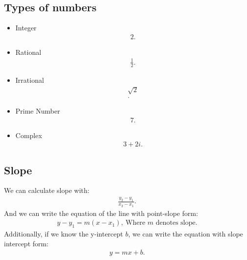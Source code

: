 \documentclass{report}
\begin{document}
    \subsection{Types of numbers}
    \begin{itemize}
        \item Integer
            \begin{align*}
                2
            .\end{align*}
        \item Rational
            \begin{align*}
                \frac{1}{2}
            .\end{align*}
        \item Irrational
            \begin{align*}
                \sqrt{2} \\
            .\end{align*}
        \item Prime Number
            \begin{align*}
                7
            .\end{align*}
        \item Complex
            \begin{align*}
                3+2i
            .\end{align*}
    \end{itemize}
     \bigbreak \noindent 
     \subsection{Slope}
     We can calculate slope with:
     \begin{align*}
       \frac{y_{2} - y_{1}}{x_{2} - x_{1}}
     .\end{align*}
     \bigbreak \noindent \bigbreak \noindent 
     And we can write the equation of the line with point-slope form:
     \bigbreak \noindent 
     \begin{align*}
       y- y_{1} = m(x-x_{1}),\ \text{Where $m$ denotes slope} 
     .\end{align*}
     \bigbreak \noindent \bigbreak \noindent 
     Additionally, if we know the y-intercept $b$, we can write the equation with slope intercept form:
     \begin{align*}
       y = mx+b
     .\end{align*}
    \bigbreak \noindent \bigbreak \noindent 
\end{document}
